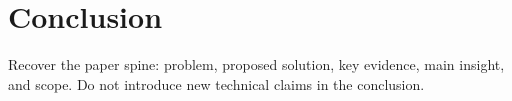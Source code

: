 \section{Conclusion}

Recover the paper spine: problem, proposed solution, key evidence, main insight, and scope. Do not introduce new technical claims in the conclusion.
